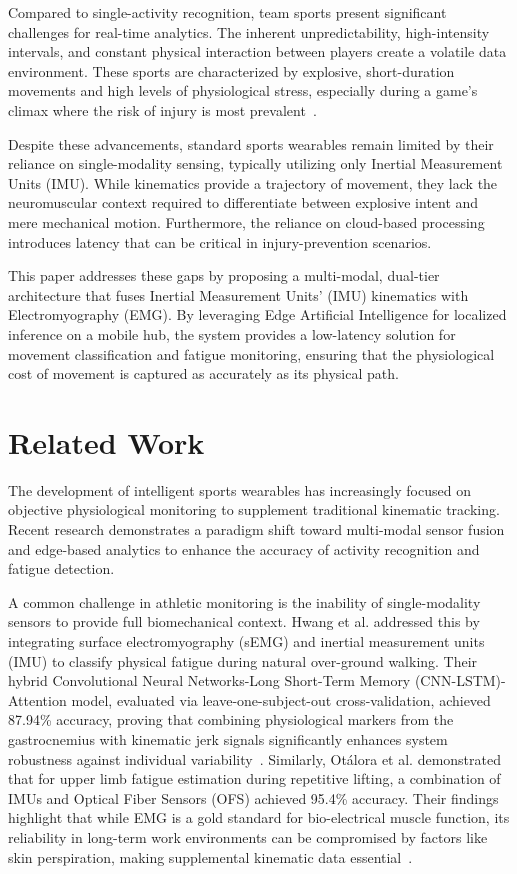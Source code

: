 \documentclass[conference]{IEEEtran}
\begin{document}
Compared to single-activity recognition, team sports present significant challenges for real-time analytics. The inherent unpredictability, 
high-intensity intervals, and constant physical interaction between players create a volatile data environment. These sports are characterized by explosive, short-duration 
movements and high levels of physiological stress, especially during a game's climax where the risk of injury is most prevalent~\cite{b1}.

Despite these advancements, standard sports wearables remain limited by their reliance on single-modality sensing, typically utilizing only Inertial Measurement Units (IMU). 
While kinematics provide a trajectory of movement, they lack the neuromuscular context required to differentiate between explosive intent and mere mechanical motion. 
Furthermore, the reliance on cloud-based processing introduces latency that can be critical in injury-prevention scenarios.

This paper addresses these gaps by proposing a multi-modal, dual-tier architecture that fuses Inertial Measurement Units' (IMU) kinematics with Electromyography (EMG). By leveraging Edge Artificial Intelligence for 
localized inference on a mobile hub, the system provides a low-latency solution for movement classification and fatigue monitoring, ensuring that the physiological cost of 
movement is captured as accurately as its physical path.


\section{Related Work}
\label{related_work}

The development of intelligent sports wearables has increasingly focused on objective physiological monitoring to supplement traditional kinematic tracking. Recent research 
demonstrates a paradigm shift toward multi-modal sensor fusion and edge-based analytics to enhance the accuracy of activity recognition and fatigue detection.

A common challenge in athletic monitoring is the inability of single-modality sensors to provide full biomechanical context. Hwang et al. addressed this by integrating surface 
electromyography (sEMG) and inertial measurement units (IMU) to classify physical fatigue during natural over-ground walking. Their hybrid Convolutional Neural Networks-Long Short-Term Memory (CNN-LSTM)-Attention 
model, evaluated via leave-one-subject-out cross-validation, achieved 87.94\% accuracy, proving that combining physiological markers from the gastrocnemius with kinematic jerk signals significantly 
enhances system robustness against individual variability~\cite{b6}. Similarly, Otálora et al. demonstrated that for upper limb fatigue estimation during repetitive lifting, a combination 
of IMUs and Optical Fiber Sensors (OFS) achieved 95.4\% accuracy. Their findings highlight that while EMG is a gold standard for bio-electrical muscle function, its reliability 
in long-term work environments can be compromised by factors like skin perspiration, making supplemental kinematic data essential~\cite{b9}.
\end{document}

